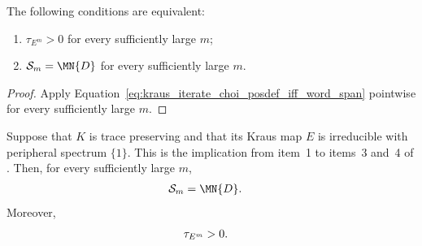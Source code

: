 \begin{corollary}
    \label{cor:kraus_iterate_eventual_choi_posdef}
    \leanok
    The following conditions are equivalent:
    \begin{enumerate}
        \item $\tau_{E^m}>0$ for every sufficiently large $m$;
        \item $\mathcal S_m=\MN{D}$ for every sufficiently large $m$.
    \end{enumerate}
\end{corollary}

\begin{proof}
    \leanok
    Apply
    Equation~\eqref{eq:kraus_iterate_choi_posdef_iff_word_span} pointwise for
    every sufficiently large $m$.
\end{proof}

\begin{theorem}
    \label{thm:kraus_primitive_irreducible_eventual_span_choi}
    \leanok
    Suppose that $K$ is trace preserving and that its Kraus map $E$ is
    irreducible with peripheral spectrum $\{1\}$. This is the implication from
    item~1 to items~3 and~4 of
    \cite[Theorem~6.8(1,3,4)]{Wolf2012Quantum}. Then, for every sufficiently
    large $m$,
    \begin{align}
        \mathcal S_m&=\MN{D}.
        \notag
    \end{align}
    Moreover,
    \begin{align}
        \tau_{E^m}&>0.
        \notag
    \end{align}
\end{theorem}

